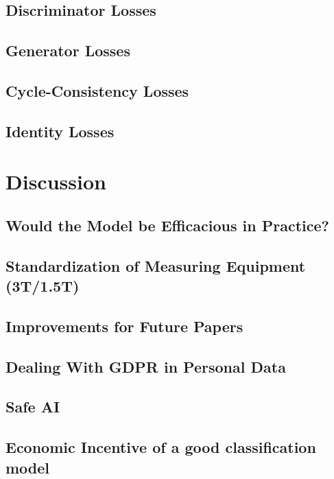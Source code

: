 \documentclass[12pt, fleqn, titlepage]{article}
\begin{document}
\subsection{Discriminator Losses}\label{disc_loss}


\subsection{Generator Losses}\label{gen_loss}


\subsection{Cycle-Consistency Losses}\label{cycle_loss}


\subsection{Identity Losses}\label{iden_loss}




\section{Discussion}\label{discussion}

\subsection{Would the Model be Efficacious in Practice?}

\subsection{Standardization of Measuring Equipment (3T/1.5T)}

\subsection{Improvements for Future Papers}

\subsection{Dealing With GDPR in Personal Data}

\subsection{Safe AI}

\subsection{Economic Incentive of a good classification model}
\end{document}
